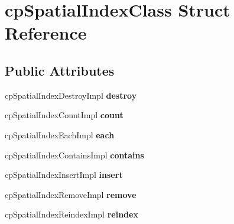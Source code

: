 \hypertarget{structcp_spatial_index_class}{\section{cp\-Spatial\-Index\-Class Struct Reference}
\label{structcp_spatial_index_class}
}
\subsection*{Public Attributes}
\begin{DoxyCompactItemize}
\item 
\hypertarget{structcp_spatial_index_class_aa81432518e81917cf388f020aa0fe766}{cp\-Spatial\-Index\-Destroy\-Impl {\bfseries destroy}}\label{structcp_spatial_index_class_aa81432518e81917cf388f020aa0fe766}

\item 
\hypertarget{structcp_spatial_index_class_a611148802f63840b1c4f8a06feacd2eb}{cp\-Spatial\-Index\-Count\-Impl {\bfseries count}}\label{structcp_spatial_index_class_a611148802f63840b1c4f8a06feacd2eb}

\item 
\hypertarget{structcp_spatial_index_class_a642ebf6c60ed3edc7da5ac477c496b61}{cp\-Spatial\-Index\-Each\-Impl {\bfseries each}}\label{structcp_spatial_index_class_a642ebf6c60ed3edc7da5ac477c496b61}

\item 
\hypertarget{structcp_spatial_index_class_a08dc3736b831e921426fbb28297494e1}{cp\-Spatial\-Index\-Contains\-Impl {\bfseries contains}}\label{structcp_spatial_index_class_a08dc3736b831e921426fbb28297494e1}

\item 
\hypertarget{structcp_spatial_index_class_a5d8a8d121853ae7bcbf934e4483daa26}{cp\-Spatial\-Index\-Insert\-Impl {\bfseries insert}}\label{structcp_spatial_index_class_a5d8a8d121853ae7bcbf934e4483daa26}

\item 
\hypertarget{structcp_spatial_index_class_a420112b7d2c3d6faf07f88db697aa369}{cp\-Spatial\-Index\-Remove\-Impl {\bfseries remove}}\label{structcp_spatial_index_class_a420112b7d2c3d6faf07f88db697aa369}

\item 
\hypertarget{structcp_spatial_index_class_acd833dc0dd2f73e703a5c4263bbf4655}{cp\-Spatial\-Index\-Reindex\-Impl {\bfseries reindex}}\label{structcp_spatial_index_class_acd833dc0dd2f73e703a5c4263bbf4655}


\end{DoxyCompactItemize}
